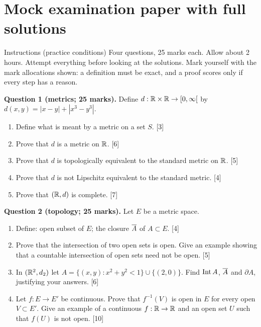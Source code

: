 \section{Mock examination paper with full solutions}

\begin{note}{Instructions (practice conditions)}
Four questions, 25 marks each. Allow about 2 hours. Attempt everything before looking at the
solutions. Mark yourself with the mark allocations shown: a definition must be exact, and a
proof scores only if every step has a reason.
\end{note}

\textbf{Question 1 (metrics; 25 marks).} Define $d:\mathbb R\times\mathbb R\to[0,\infty[$ by
$d(x,y)=|x-y|+|x^3-y^3|$.
\begin{enumerate}[label=(\alph*)]
\item Define what is meant by a metric on a set $S$. \hfill[3]
\item Prove that $d$ is a metric on $\mathbb R$. \hfill[6]
\item Prove that $d$ is topologically equivalent to the standard metric on $\mathbb R$. \hfill[5]
\item Prove that $d$ is not Lipschitz equivalent to the standard metric. \hfill[4]
\item Prove that $(\mathbb R,d)$ is complete. \hfill[7]
\end{enumerate}

\textbf{Question 2 (topology; 25 marks).} Let $E$ be a metric space.
\begin{enumerate}[label=(\alph*)]
\item Define: open subset of $E$; the closure $\overline{A}$ of $A\subset E$. \hfill[4]
\item Prove that the intersection of two open sets is open. Give an example showing that a
  countable intersection of open sets need not be open. \hfill[5]
\item In $(\mathbb R^2,d_2)$ let $A=\{(x,y):x^2+y^2<1\}\cup\{(2,0)\}$. Find $\operatorname{Int} A$, $\overline{A}$ and
  $\partial A$, justifying your answers. \hfill[6]
\item Let $f:E\to E'$ be continuous. Prove that $f^{-1}(V)$ is open in $E$ for every open
  $V\subset E'$. Give an example of a continuous $f:\mathbb R\to\mathbb R$ and an open set $U$ such that $f(U)$
  is not open. \hfill[10]
\end{enumerate}

